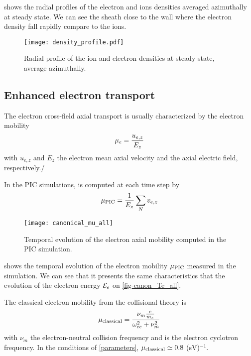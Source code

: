    shows the radial profiles of the electron and ions densities averaged azimuthally at steady state.
  We can see the sheath close to the wall where the electron density fall rapidly compare to the ions.
  
  \begin{figure}[hbtp]
    \centering
    \texttt{[image: density\_profile.pdf]}
    \caption{Radial profile of the ion and electron densities at steady state, average azimuthally.}
    \label{fig-profiles}
  \end{figure}
  
  \subsection{Enhanced electron transport} \label{subsec-canonmue}
  The electron cross-field axial transport is usually characterized by the electron mobility
  \begin{equation} \label{eq-mobdef}
    \mu_e = \frac{u_{e, z}}{E_z}
  \end{equation}
  with $u_{e,z}$ and $E_z$ the electron mean axial velocity and the axial electric field, respectively./
  
  In the \ac{PIC} simulations, \mob is computed at each time step by
  \begin{equation} \label{eq-mobpic}
    \mu_{\mathrm{PIC}} = \frac{1}{E_z} \sum_N v_{e,z}
  \end{equation}

  \begin{figure}[hbtp]
    \centering
    \texttt{[image: canonical\_mu\_all]}
    \caption{Temporal evolution of the electron axial mobility computed in the \ac{PIC} simulation.}
    \label{fig-canon_mu}
  \end{figure}
  
   shows the temporal evolution of the electron mobility $\mu_{\mathrm{PIC}}$ measured in the simulation.
  We can see that it presents the same characteristics that the evolution of the electron energy ${\mathcal{E}_e}$ on \cref{fig-canon_Te_all}.
  
  The classical electron mobility from the collisional theory is \citep{lafleur2016a}
  \begin{equation} \label{eq-muclass}
    \mu_{\mathrm{classical}} = \frac{\nu_m \frac{e}{m_e}}{\omega_{ce}^2 + \nu_m^2}
  \end{equation}
  with $\nu_m$ the electron-neutral  collision frequency and \oce is the electron cyclotron frequency.
  In the conditions of \cref{parameters}, $\mu_{\mathrm{classical}} \simeq 0.8$ \square\meter(sV)$^{-1}$.
  
